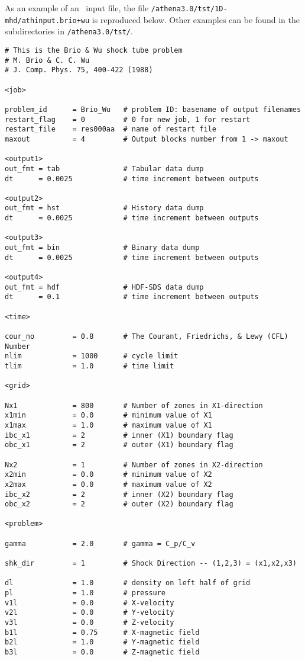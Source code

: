 As an example of an \ath\ input file, the file 
{\tt /athena3.0/tst/1D-mhd/athinput.brio+wu} is reproduced below.
Other examples can be found in the subdirectories in {\tt /athena3.0/tst/}.

\footnotesize
\begin{verbatim}
# This is the Brio & Wu shock tube problem
# M. Brio & C. C. Wu 
# J. Comp. Phys. 75, 400-422 (1988)

<job>

problem_id      = Brio_Wu   # problem ID: basename of output filenames
restart_flag    = 0         # 0 for new job, 1 for restart
restart_file    = res000aa  # name of restart file
maxout          = 4         # Output blocks number from 1 -> maxout

<output1>
out_fmt = tab               # Tabular data dump
dt      = 0.0025            # time increment between outputs

<output2>
out_fmt = hst               # History data dump
dt      = 0.0025            # time increment between outputs

<output3>
out_fmt = bin               # Binary data dump
dt      = 0.0025            # time increment between outputs

<output4>
out_fmt = hdf               # HDF-SDS data dump
dt      = 0.1               # time increment between outputs

<time>

cour_no         = 0.8       # The Courant, Friedrichs, & Lewy (CFL) Number
nlim            = 1000      # cycle limit
tlim            = 1.0       # time limit

<grid>

Nx1             = 800       # Number of zones in X1-direction
x1min           = 0.0       # minimum value of X1
x1max           = 1.0       # maximum value of X1
ibc_x1          = 2         # inner (X1) boundary flag
obc_x1          = 2         # outer (X1) boundary flag

Nx2             = 1         # Number of zones in X2-direction
x2min           = 0.0       # minimum value of X2
x2max           = 0.0       # maximum value of X2
ibc_x2          = 2         # inner (X2) boundary flag
obc_x2          = 2         # outer (X2) boundary flag

<problem>

gamma           = 2.0       # gamma = C_p/C_v

shk_dir         = 1         # Shock Direction -- (1,2,3) = (x1,x2,x3)

dl              = 1.0       # density on left half of grid
pl              = 1.0       # pressure
v1l             = 0.0       # X-velocity
v2l             = 0.0       # Y-velocity
v3l             = 0.0       # Z-velocity
b1l             = 0.75      # X-magnetic field
b2l             = 1.0       # Y-magnetic field
b3l             = 0.0       # Z-magnetic field


\end{verbatim}
